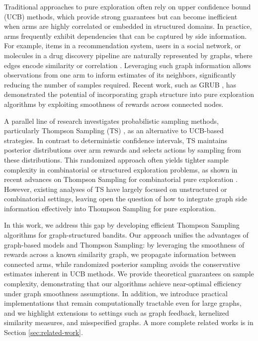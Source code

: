 \documentclass{article}
\begin{document}
Traditional approaches to pure exploration often rely on upper confidence bound (UCB) methods, which provide strong guarantees but can become inefficient when arms are highly correlated or embedded in structured domains. In practice, arms frequently exhibit dependencies that can be captured by side information. For example, items in a recommendation system, users in a social network, or molecules in a drug discovery pipeline are naturally represented by graphs, where edges encode similarity or correlation \citep{gentile2014online, li2016collaborative}. Leveraging such graph information allows observations from one arm to inform estimates of its neighbors, significantly reducing the number of samples required. Recent work, such as GRUB \citep{thaker2022maximizing}, has demonstrated the potential of incorporating graph structure into pure exploration algorithms by exploiting smoothness of rewards across connected nodes.

A parallel line of research investigates probabilistic sampling methods, particularly Thompson Sampling (TS) \citep{thompson1933likelihood}, as an alternative to UCB-based strategies. In contrast to deterministic confidence intervals, TS maintains posterior distributions over arm rewards and selects actions by sampling from these distributions. This randomized approach often yields tighter sample complexity in combinatorial or structured exploration problems, as shown in recent advances on Thompson Sampling for combinatorial pure exploration \citep{wang2022thompson}. However, existing analyses of TS have largely focused on unstructured or combinatorial settings, leaving open the question of how to integrate graph side information effectively into Thompson Sampling for pure exploration.

In this work, we address this gap by developing efficient Thompson Sampling algorithms for graph-structured bandits. Our approach unifies the advantages of graph-based models and Thompson Sampling: by leveraging the smoothness of rewards across a known similarity graph, we propagate information between connected arms, while randomized posterior sampling avoids the conservative estimates inherent in UCB methods. We provide theoretical guarantees on sample complexity, demonstrating that our algorithms achieve near-optimal efficiency under graph smoothness assumptions. In addition, we introduce practical implementations that remain computationally tractable even for large graphs, and we highlight extensions to settings such as graph feedback, kernelized similarity measures, and misspecified graphs. A more complete related works is in Section \ref{sec:related-work}.  
\end{document}
